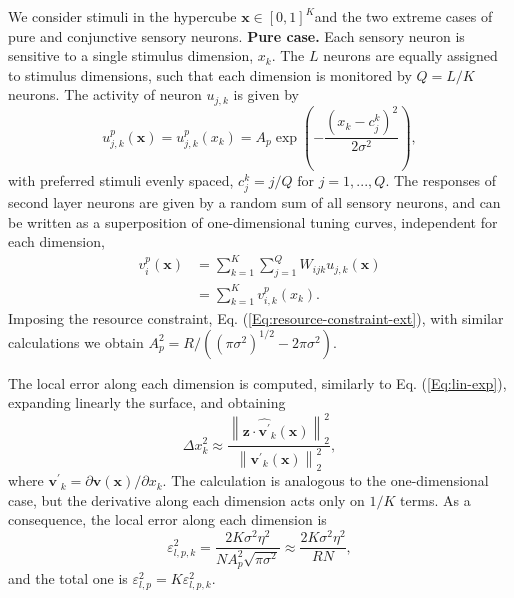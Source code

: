 \documentclass[a4paper]{article}%
\begin{document}
We consider stimuli in the hypercube $\mathbf{x} \in[0,1]^{K}$and the two
extreme cases of pure and conjunctive sensory neurons. \newline\newline
\textbf{Pure case.} Each sensory neuron is sensitive to a single stimulus
dimension, $x_{k}$. The $L$ neurons are equally assigned to stimulus
dimensions, such that each dimension is monitored by $Q = L/K$ neurons. The
activity of neuron $u_{j,k}$ is given by
\begin{equation}
u^{p}_{j,k}(\mathbf{x}) = u^{p}_{j,k}(x_k) = A_{p} \exp\left(  -\frac{\left(  x_{k} - c^k_j
\right)  ^{2}}{2\sigma^{2}}\right)  ,
\end{equation}
with preferred stimuli evenly spaced, $c^k_{j} = j/Q \text{ for }
j=1,...,Q $. The responses of second layer neurons are given by a random
sum of all sensory neurons, and can be written as a superposition of
one-dimensional tuning curves, independent for each dimension,
\begin{equation}
\begin{split}
v_{i}^{p}(\mathbf{x})  &  = \sum_{k=1}^{K} \sum_{j=1}^{Q} W_{ijk}
u_{j,k}(\mathbf{x})\\
&  = \sum_{k=1}^{K} v_{i,k}^{p}(x_{k}).
\end{split}
\end{equation}
Imposing the resource constraint, Eq. (\ref{Eq:resource-constraint-ext}), with
similar calculations we obtain $A_{p}^{2} = R/\left(  \left(  \pi\sigma
^{2}\right)  ^{1/2} - 2\pi\sigma^{2}\right)  $.

The local error along each dimension is computed, similarly to Eq.
(\ref{Eq:lin-exp}), expanding linearly the surface, and obtaining
\begin{equation}
\Delta x_{k}^{2} \approx\frac{\left\|  \mathbf{z}\cdot\hat{\mathbf{v^{\prime}%
}}_{k}(\mathbf{x})\right\|  _{2}^{2}}{\left\|  \mathbf{v^{\prime}}_{k}(\mathbf{x})\right\|
_{2}^{2}}, \label{Eq:MD-le}%
\end{equation}
where $\mathbf{v^{\prime}}_{k} = \partial\mathbf{v}(\mathbf{x})/\partial x_{k}$. The
calculation is analogous to the one-dimensional case, but the derivative along
each dimension acts only on $1/K$ terms. As a consequence, the local error
along each dimension is
\begin{equation}
\varepsilon^{2}_{l,p,k} = \frac{2 K \sigma^{2} \eta^{2}}{N A_{p}^{2} \sqrt
{\pi\sigma^{2}}} \approx\frac{2 K \sigma^{2} \eta^{2}}{RN},
\label{Eq:multi-local-pure}%
\end{equation}
and the total one is $\varepsilon^{2}_{l,p} = K\varepsilon_{l,p,k}^{2}$.
\end{document}
